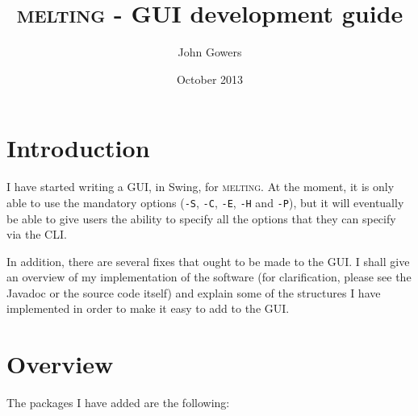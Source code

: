 \documentclass{article}
\begin{document}
\title{\textsc{melting} - GUI development guide}
\author{John Gowers}
\date{October 2013}
\maketitle

\newpage

\tableofcontents

\newpage

\section{Introduction}

I have started writing a GUI, in Swing, for \textsc{melting}.  At the moment,
it is only able to use the mandatory options (\texttt{-S}, \texttt{-C},
\texttt{-E}, \texttt{-H} and \texttt{-P}), but it will eventually be able to
give users the ability to specify all the options that they can specify via the
CLI.  

In addition, there are several fixes that ought to be made to the GUI.  I shall
give an overview of my implementation of the software (for clarification,
please see the Javadoc or the source code itself) and explain some of the
structures I have implemented in order to make it easy to add to the GUI.  

\section{Overview}

The packages I have added are the following: 
\end{document}

